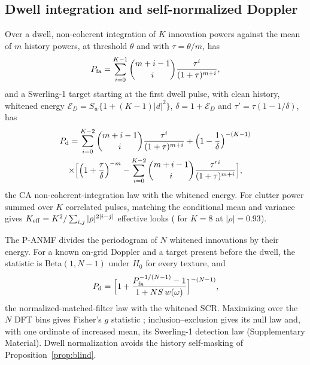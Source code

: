 \documentclass[journal]{IEEEtran}
\begin{document}
\subsection{Dwell integration and self-normalized Doppler}
Over a dwell, non-coherent integration of $K$ innovation powers against the mean of $m$ history powers, at threshold $\theta$ and with $\tau=\theta/m$, has
\begin{equation}
P_{\rm fa}=\sum_{i=0}^{K-1}\binom{m+i-1}{i}\frac{\tau^i}{(1+\tau)^{m+i}},
\label{eq:dwellpfa}
\end{equation}
and a Swerling-1 target starting at the first dwell pulse, with clean history, whitened energy $\mathcal E_D=S_w\{1+(K-1)|d|^2\}$, $\delta=1+\mathcal E_D$ and $\tau'=\tau(1-1/\delta)$, has
\begin{multline}
P_{\rm d}=\sum_{i=0}^{K-2}\binom{m+i-1}{i}\frac{\tau^i}{(1+\tau)^{m+i}}+\Big(1-\frac1\delta\Big)^{-(K-1)}\\
\times\Big[\Big(1+\frac{\tau}{\delta}\Big)^{-m}-\sum_{i=0}^{K-2}\binom{m+i-1}{i}\frac{\tau'^{\,i}}{(1+\tau)^{m+i}}\Big],
\label{eq:dwellpd}
\end{multline}
the CA non-coherent-integration law \cite{gandhi1988,richards2014} with the whitened energy. For clutter power summed over $K$ correlated pulses, matching the conditional mean and variance gives $K_{\rm eff}=K^2/\sum_{i,j}|\rho|^{2|i-j|}$ effective looks (\ThKeff{} for $K=8$ at $|\rho|=0.93$).

The P-ANMF divides the periodogram of $N$ whitened innovations by their energy. For a known on-grid Doppler and a target present before the dwell, the statistic is Beta$(1,N-1)$ under $H_0$ for every texture, and
\begin{equation}
P_{\rm d}=\Big[1+\frac{P_{\rm fa}^{-1/(N-1)}-1}{1+N S\,w(\omega)}\Big]^{-(N-1)},
\label{eq:panmf}
\end{equation}
the normalized-matched-filter law \cite{kraut1999,conte1995} with the whitened SCR. Maximizing over the $N$ DFT bins gives Fisher's $g$ statistic \cite{fisher1929g}; inclusion--exclusion gives its null law and, with one ordinate of increased mean, its Swerling-1 detection law (Supplementary Material). Dwell normalization avoids the history self-masking of Proposition~\ref{prop:blind}.
\end{document}

